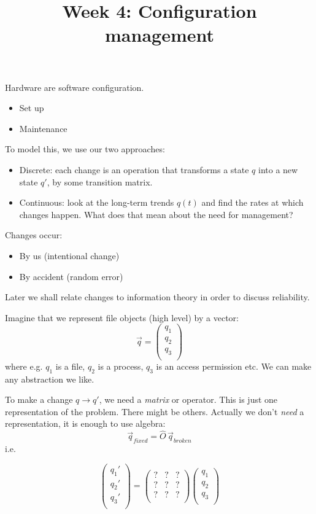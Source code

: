 \documentclass{slides}
\title{Week 4: Configuration management}
\begin{document}
\maketitle


Hardware are software configuration.
\begin{itemize}
\item Set up
\item Maintenance
\end{itemize}

To model this, we use our two approaches:
\begin{itemize}
\item Discrete: each change is an operation that transforms a state $q$ into a new state $q'$, by some transition
matrix.
\item Continuous: look at the long-term trends $q(t)$ and find the rates at which changes happen. What does that mean about the need for management?
\end{itemize}

Changes occur:
\begin{itemize}
\item By us (intentional change)
\item By accident (random error)
\end{itemize}
Later we shall relate changes to information theory in order to discuss reliability.



Imagine that we represent file objects (high level) by a vector:
$$
\vec q = \left(
\begin{array}{c}
q_1\\
q_2\\
q_3\\
\end{array}
\right)
$$
where e.g. $q_1$ is a file, $q_2$ is a process, $q_3$ is an access permission etc.
We can make any abstraction we like.

To make a change $q\rightarrow q'$, we need a {\em matrix} or operator.
This is just one representation of the problem. There might be others.
Actually we don't {\em need} a representation, it is enough to use algebra:
$$
\vec q_{fixed} = \hat O\,\vec q_{broken}
$$
i.e.

$$
\left(
\begin{array}{c}
q_1'\\
q_2'\\
q_3'\\
\end{array}
\right) =
\left(
\begin{array}{ccc}
? & ? & ?\\
? & ? & ?\\
? & ? & ?\\
\end{array}
\right)
\left(
\begin{array}{c}
q_1\\
q_2\\
q_3\\
\end{array}
\right)
$$
\end{document}
